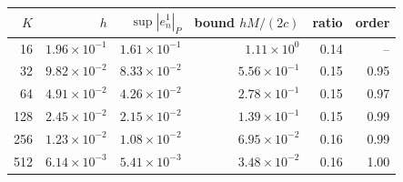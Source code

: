 \begin{tabular}{rrrrrr}
\toprule
$K$ & $h$ & $\sup|e^1_n|_P$ & bound $hM/(2c)$ & ratio & order\\
\midrule
16 & $1.96\times10^{-1}$ & $1.61\times10^{-1}$ & $1.11\times10^{0}$ & 0.14 & --\\
32 & $9.82\times10^{-2}$ & $8.33\times10^{-2}$ & $5.56\times10^{-1}$ & 0.15 & 0.95\\
64 & $4.91\times10^{-2}$ & $4.26\times10^{-2}$ & $2.78\times10^{-1}$ & 0.15 & 0.97\\
128 & $2.45\times10^{-2}$ & $2.15\times10^{-2}$ & $1.39\times10^{-1}$ & 0.15 & 0.99\\
256 & $1.23\times10^{-2}$ & $1.08\times10^{-2}$ & $6.95\times10^{-2}$ & 0.16 & 0.99\\
512 & $6.14\times10^{-3}$ & $5.41\times10^{-3}$ & $3.48\times10^{-2}$ & 0.16 & 1.00\\
\bottomrule
\end{tabular}